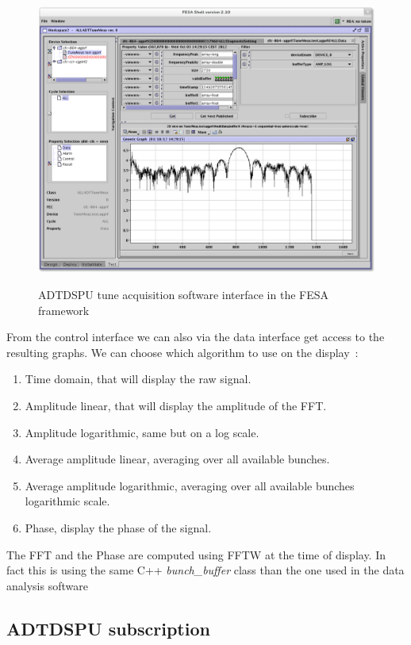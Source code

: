 \begin{figure}[H]
\caption{ADTDSPU tune acquisition software interface in the FESA framework}
\centering
\includegraphics[scale=0.25]{amplitude_log.pdf}
\label{fig:tuneacq}
\end{figure}

From the control interface we can also via the data interface get access to the resulting graphs. We can choose which algorithm to use on the display~:

\begin{enumerate}
\item Time domain, that will display the raw signal.
\item Amplitude linear, that will display the amplitude of the FFT.
\item Amplitude logarithmic, same but on a log scale.
\item Average amplitude linear, averaging over all available bunches.
\item Average amplitude logarithmic, averaging over all available bunches logarithmic scale.
\item Phase, display the phase of the signal.
\end{enumerate}

The FFT and the Phase are computed using FFTW at the time of display. In fact this is using the same C++ \emph{bunch\_buffer} class than the one used in the data analysis software 

\subsection{ADTDSPU subscription}

